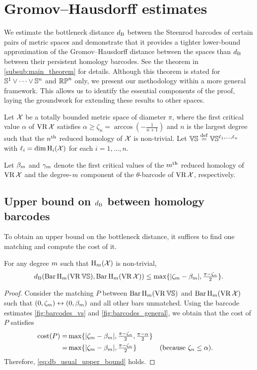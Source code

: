 \section{Gromov--Hausdorff estimates}\label{prop:db estimate}

We estimate the bottleneck distance $\db$ between the Steenrod barcodes of certain pairs of metric spaces and demonstrate that it provides a tighter lower-bound approximation of the Gromov–Hausdorff distance between the spaces than $\db$ between their persistent homology barcodes.
See the theorem in \cref{subsub:main_theorem} for details.
Although this theorem is stated for $\bS^1\vee\dots\vee \bS^n$ and $\rp^n$ only, we present our methodology within a more general framework.
This allows us to identify the essential components of the proof, laying the groundwork for extending these results to other spaces.

Let $\cX$ be a totally bounded metric space of diameter $\pi$, where the first critical value $\alpha$ of $\VR\cX$ satisfies $\alpha \geq \zeta_n = \arccos{(-\tfrac{1}{n+1})}$ and $n$ is the largest degree such that the $n^\th$ reduced homology of $\cX$ is non-trivial.
Let $\VS \defeq \VS^{\ell_1, \dots, \ell_n}$ with $\ell_i = \dim \opH_i(\cX)$ for each $i=1, \dots, n$.

Let $\beta_\degp$ and $\gamma_\degp$ denote the first critical values of the $\degp^\th$ reduced homology of $\VR\cX$ and the degree-$\degp$ component of the $\theta$-barcode of $\VR\cX$, respectively.

\subsection{Upper bound on $\db$ between homology barcodes}
\label{subsub:db_upper_bound}

To obtain an upper bound on the bottleneck distance, it suffices to find one matching and compute the cost of it.

\medskip\proposition
For any degree $\degp$ such that $\opH_\degp(\cX)$ is non-trivial,
\begin{equation}\label{eq:db_usual_upper_bound}
	\db(\Hbarc[\field]{\degp}{\VS}, \Hbarc[\field]{\degp}{\cX})
	\leq \max\{|\zeta_\degp  - \beta_\degp |, \tfrac{\pi - \zeta_n}{2}\}.
\end{equation}

\begin{proof}
	Consider the matching $P$ between $\Hbarc[\field]{\degp}{\VS}$ and $\Hbarc[\field]{\degp}{\cX}$ such that $(0,\zeta_\degp ) \leftrightarrow (0, \beta_\degp )$ and all other bars unmatched.
	Using the barcode estimates \cref{fig:barcodes_vs} and \cref{fig:barcodes_general}, we obtain that the cost of $P$ satisfies
	\begin{align*}
		\cost(P)
		= & \max\{|\zeta_\degp  - \beta_\degp |, \tfrac{\pi - \zeta_n}{2}, \tfrac{\pi - \alpha}{2}\} \\
		= & \max\{|\zeta_\degp  - \beta_\degp |, \tfrac{\pi - \zeta_n}{2}\} && \mbox{(because $\zeta_n \leq \alpha$)}.
	\end{align*}
	Therefore, \cref{eq:db_usual_upper_bound} holds.
\end{proof}


